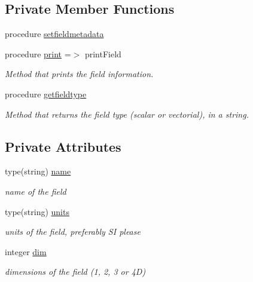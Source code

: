 \subsection*{Private Member Functions}
\begin{DoxyCompactItemize}
\item 
procedure \mbox{\hyperlink{structfield__types__mod_1_1field__class_adfda6a5c992c8cfff7b42a648093cfd0}{setfieldmetadata}}
\item 
procedure \mbox{\hyperlink{structfield__types__mod_1_1field__class_a29971d16f545e2b43616ba928ac69c1b}{print}} =$>$ print\+Field
\begin{DoxyCompactList}\small\item\em Method that prints the field information. \end{DoxyCompactList}\item 
procedure \mbox{\hyperlink{structfield__types__mod_1_1field__class_a849b182cbc2c6fca4840f2d2b4f4ee97}{getfieldtype}}
\begin{DoxyCompactList}\small\item\em Method that returns the field type (scalar or vectorial), in a string. \end{DoxyCompactList}\end{DoxyCompactItemize}
\subsection*{Private Attributes}
\begin{DoxyCompactItemize}
\item 
type(string) \mbox{\hyperlink{structfield__types__mod_1_1field__class_ab7089941565bc867fe3f39765b0047e9}{name}}
\begin{DoxyCompactList}\small\item\em name of the field \end{DoxyCompactList}\item 
type(string) \mbox{\hyperlink{structfield__types__mod_1_1field__class_a9bdad661b68fbf5c6a93c55edfda0084}{units}}
\begin{DoxyCompactList}\small\item\em units of the field, preferably SI please \end{DoxyCompactList}\item 
integer \mbox{\hyperlink{structfield__types__mod_1_1field__class_adc3749ef53ca179d5d48e253d4d06710}{dim}}
\begin{DoxyCompactList}\small\item\em dimensions of the field (1, 2, 3 or 4D) \end{DoxyCompactList}\end{DoxyCompactItemize}


